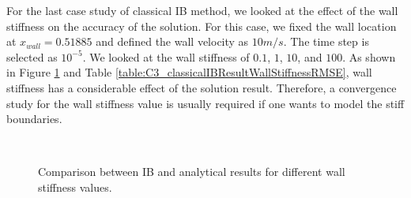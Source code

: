 For the last case study of classical IB method, we looked at the effect of the wall stiffness on the accuracy of the solution. For this case, we fixed the wall location at $x_{wall} = 0.51885$ and defined the wall velocity as $10 m/s$. The time step is selected as $10^{-5}$. We looked at the wall stiffness of $0.1$, $1$, $10$, and $100$. As shown in Figure \ref{fig:C3_classicalIBResultWallStiffness} and Table \ref{table:C3_classicalIBResultWallStiffnessRMSE}, wall stiffness has a considerable effect of the solution result. Therefore, a convergence study for the wall stiffness value is usually required if one wants to model the stiff boundaries.

\begin{figure}[H]
	\centering
	\quad
	\\
	\quad
	\caption{Comparison between IB and analytical results for different wall stiffness values.}
	\label{fig:C3_classicalIBResultWallStiffness}
\end{figure}

